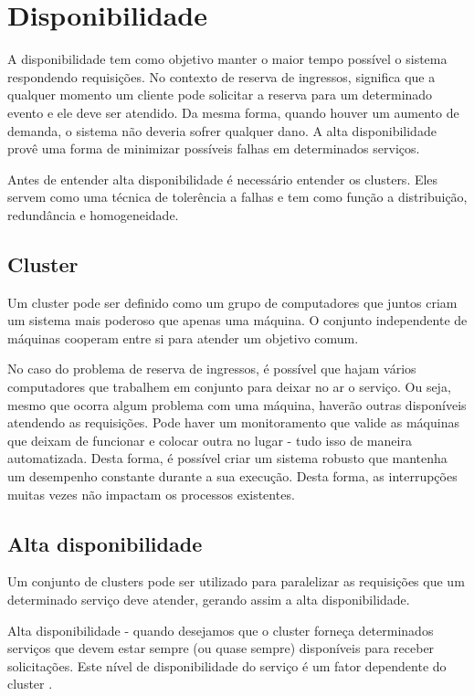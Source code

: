 \chapter{Disponibilidade}

A disponibilidade tem como objetivo manter o maior tempo possível
o sistema respondendo requisições. No contexto de reserva de ingressos,
significa que a qualquer momento um cliente pode solicitar a reserva para
um determinado evento e ele deve ser atendido. Da mesma forma, quando houver
um aumento de demanda, o sistema não deveria sofrer qualquer dano. A alta
disponibilidade provê uma forma de minimizar possíveis falhas em determinados
serviços.

Antes de entender alta disponibilidade é necessário entender os clusters.
Eles servem como uma técnica de tolerência a falhas e tem como função a
distribuição, redundância e homogeneidade.

\section{Cluster}\label{cluster}

Um cluster pode ser definido como um grupo de computadores que juntos
criam um sistema mais poderoso que apenas uma máquina. O conjunto
independente de máquinas cooperam entre si para atender um objetivo comum.

No caso do problema de reserva de ingressos, é possível que hajam vários
computadores que trabalhem em conjunto para deixar no ar o serviço.
Ou seja, mesmo que ocorra algum problema com uma máquina, haverão outras
disponíveis atendendo as requisições.
Pode haver um monitoramento que valide as máquinas que deixam de funcionar
e colocar outra no lugar - tudo isso de maneira automatizada.
Desta forma, é possível criar um sistema robusto que mantenha um desempenho
constante durante a sua execução.
Desta forma, as interrupções muitas vezes não impactam os processos existentes.

\section{Alta disponibilidade}

Um conjunto de clusters pode ser utilizado para paralelizar as requisições
que um determinado serviço deve atender, gerando assim a alta disponibilidade.

\begin{citacao}

Alta disponibilidade - quando desejamos que o cluster forneça determinados
serviços que devem estar sempre (ou quase sempre) disponíveis para receber
solicitações.
Este nível de disponibilidade do serviço é um fator dependente do cluster
\cite{servicos-de-pertinencia-para-clusters-de-alta-disponibilidade}.

\end{citacao}

